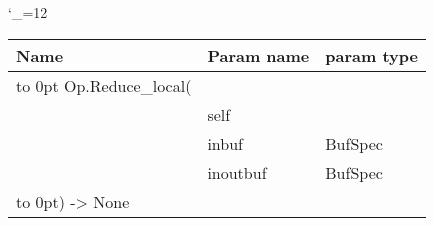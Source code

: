 \begingroup \catcode`\_=12 \tt
\begin{tabular}{lll}
\toprule
\textrm{Name}&\textrm{Param name}&\textrm{param type}\\
\midrule
\hbox to 0pt {Op.Reduce_local(\hss}\\
& self\\
& inbuf & BufSpec\\
& inoutbuf & BufSpec\\
\hbox to 0pt{) -> None\hss}\\
\bottomrule
\end{tabular}
\endgroup
